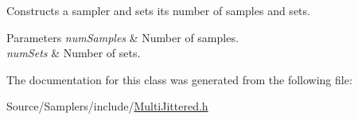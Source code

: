 Constructs a sampler and sets its number of samples and sets. 
\begin{DoxyParams}{Parameters}
{\em num\+Samples} & Number of samples. \\
\hline
{\em num\+Sets} & Number of sets. \\
\hline
\end{DoxyParams}


The documentation for this class was generated from the following file\+:\begin{DoxyCompactItemize}
\item 
Source/\+Samplers/include/\hyperlink{_multi_jittered_8h}{Multi\+Jittered.\+h}\end{DoxyCompactItemize}
